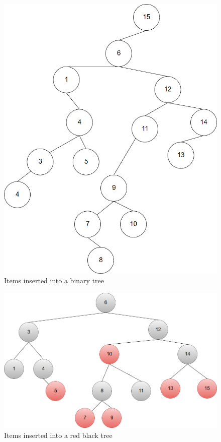 \documentclass{article}
\begin{document}
\begin{enumerate}
 	\begin{figure}[H]
 	  \centering
 	  \caption{Items inserted into a binary tree}
 	  \label{Trees:BinaryTree}
	  \includegraphics[width=\textwidth]{BinaryTree3}
    \end{figure}
      
    \begin{figure}[H]
 	  \centering
 	  \caption{Items inserted into a red black tree}
 	  \label{Trees:RedBlackTree}
	  \includegraphics[width=\textwidth]{RedBlackTree}
    \end{figure}


\end{enumerate}
\end{document}

